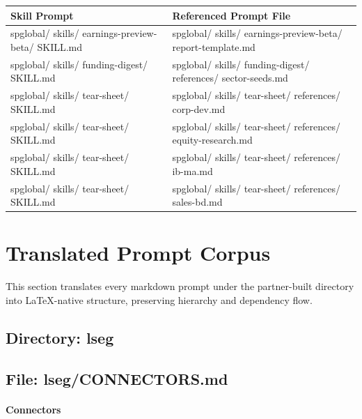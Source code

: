 \documentclass[11pt]{article}
\begin{document}
\begingroup
\small
\setlength{\tabcolsep}{2pt}
\begin{longtable}{>{\RaggedRight\arraybackslash\hspace{0pt}}p{}>{\RaggedRight\arraybackslash\hspace{0pt}}p{}}
\toprule
{} \textbf{Skill Prompt} & \textbf{Referenced Prompt File} \\
\midrule
{} spglobal/ skills/ earnings-preview-beta/ SKILL.md & spglobal/ skills/ earnings-preview-beta/ report-template.md \\
{} spglobal/ skills/ funding-digest/ SKILL.md & spglobal/ skills/ funding-digest/ references/ sector-seeds.md \\
{} spglobal/ skills/ tear-sheet/ SKILL.md & spglobal/ skills/ tear-sheet/ references/ corp-dev.md \\
{} spglobal/ skills/ tear-sheet/ SKILL.md & spglobal/ skills/ tear-sheet/ references/ equity-research.md \\
{} spglobal/ skills/ tear-sheet/ SKILL.md & spglobal/ skills/ tear-sheet/ references/ ib-ma.md \\
{} spglobal/ skills/ tear-sheet/ SKILL.md & spglobal/ skills/ tear-sheet/ references/ sales-bd.md \\
\bottomrule
\end{longtable}
\endgroup

\newpage

\section{Translated Prompt Corpus}

This section translates every markdown prompt under the partner-built directory into LaTeX-native structure, preserving hierarchy and dependency flow.

\subsection{Directory: lseg}

\subsection{File: lseg/CONNECTORS.md}\label{file:lseg-CONNECTORS.md}

\paragraph{Connectors}\mbox{}\par
\end{document}
